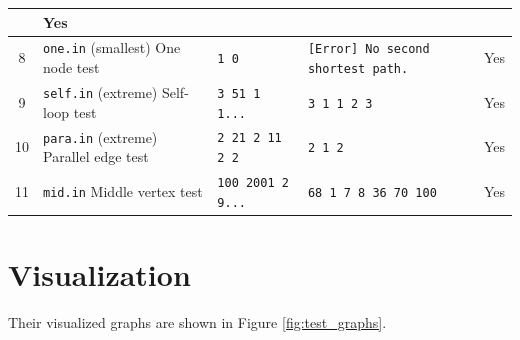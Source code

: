 \documentclass[a4paper,oneside]{book}
\begin{document}
\begin{longtable}{|c|p{3cm}|p{3.6cm}|p{3.6cm}|c|}
        & Yes\\ \hline
    8   & \verb|one.in|\newline{} (smallest) \newline{} One node test
        & \lstinline!1 0!
        & \lstinline![Error] No second shortest path.!
        & Yes\\ \hline
    9  & \verb|self.in|\newline{} (extreme) \newline{} Self-loop test
        & \lstinline!3 5!\newline{}\lstinline!1 1 1!\newline{}\lstinline!...!
        & \lstinline!3 1 1 2 3!
        & Yes\\ \hline
    10  & \verb|para.in|\newline{} (extreme) \newline{} Parallel edge test
        & \lstinline!2 2!\newline{}\lstinline!1 2 1!\newline{}\lstinline!1 2 2!
        & \lstinline!2 1 2!
        & Yes\\ \hline
    11  & \verb|mid.in|\newline{} Middle vertex test
        & \lstinline!100 200!\newline{}\lstinline!1 2 9!\newline{}\lstinline!...!
        & \lstinline!68 1 7 8 36 70 100!
        & Yes\\ \hline
\end{longtable}

\section{Visualization}

Their visualized graphs are shown in Figure \ref{fig:test_graphs}.
\end{document}
